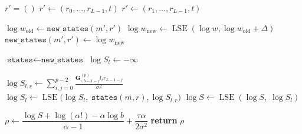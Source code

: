 \documentclass{article}
\theoremstyle{plain}
\theoremstyle{definition}
\theoremstyle{remark}
\begin{document}
\begin{algorithm}[t!]
\begin{algorithmic}[1]
            \STATE $r' = ()$
                \STATE $r' \leftarrow (r_0,\dots,r_{L-1}, t)$
            \ELSE
                \STATE $r' \leftarrow (r_1,\dots,r_{L-1}, t)$
            \ENDIF
            
            \STATE $\log w_{\text{old}} \leftarrow \texttt{new\_states}(m',r')$
            \STATE
            $\log w_{\text{new}}
            \leftarrow
            \operatorname{LSE}(\log w, \log w_{\text{old}} + \Delta)$
            \STATE
            $\texttt{new\_states}(m',r')
            \leftarrow
            \log w_{\text{new}}$
        \ENDFOR
    \ENDFOR

    \STATE $\texttt{states} \leftarrow \texttt{new\_states}$
\ENDFOR
\STATE $\log S_l \leftarrow -\infty$

        \STATE $\log S_{l,r} \leftarrow \sum\limits_{i,j=0}^{p - 2} \frac{\mathbf{G}^{(p)}_{i, b-1 -j}l_i r_{L - 1 - j}}{\sigma^2}$
        \STATE $\log S_l \leftarrow \operatorname{LSE}\bigg(\log S_l,\; \texttt{states}(m,r), \log S_{l,r}\bigg)$
    \ENDIF
\ENDFOR
\STATE $\log S \leftarrow \operatorname{LSE}(\log S,\; \log S_l)$

\ENDFOR

\STATE
$\rho \leftarrow
\dfrac{\log S + \log(\alpha!) - \alpha \log b}{\alpha - 1}
+ \dfrac{\tau \alpha}{2\sigma^2}$
\STATE \textbf{return} $\rho$
\end{algorithmic}
\end{algorithm}
\end{document}
